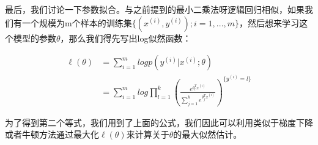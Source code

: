 \documentclass[UTF8]{ctexart}
\begin{document}
最后，我们讨论一下参数拟合。与之前提到的最小二乘法呀逻辑回归相似，如果我们有一个规模为m个样本的训练集$\{(x^{(i)},y^{(i)});i=1,...,m\}$，然后想来学习这个模型的参数$\theta$，那么我们得先写出log似然函数：

\begin{align*}
\ell (\theta)  & = \sum_{i=1}^{m} logp(y^{(i)}|x^{(i)};\theta)\\
& = \sum_{i=1}^{m} log \prod_{l=1}^{k} (\frac{e^{\theta_{l}^{T}x^{(i)}}}{\sum_{j=1}^{k}e^{\theta_{j}^{T}x^{(i)}}})^{\{y^{(i)} = l \}}
\end{align*}

为了得到第二个等式，我们用到了上面的公式，我们因此可以利用类似于梯度下降或者牛顿方法通过最大化$\ell(\theta)$来计算关于$\theta$的最大似然估计。
\end{document}
